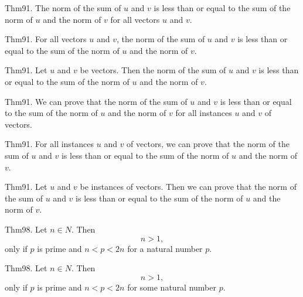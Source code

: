 \documentclass{article}
\begin{document}
Thm91. The norm of the sum of $u$ and $v$ is less than or equal to the sum of the norm of $u$ and the norm of $v$ for all vectors $u$ and $v$.

Thm91. For all vectors $u$ and $v$, the norm of the sum of $u$ and $v$ is less than or equal to the sum of the norm of $u$ and the norm of $v$.

Thm91. Let $u$ and $v$ be vectors. Then the norm of the sum of $u$ and $v$ is less than or equal to the sum of the norm of $u$ and the norm of $v$.

Thm91. We can prove that the norm of the sum of $u$ and $v$ is less than or equal to the sum of the norm of $u$ and the norm of $v$ for all instances $u$ and $v$ of vectors.

Thm91. For all instances $u$ and $v$ of vectors, we can prove that the norm of the sum of $u$ and $v$ is less than or equal to the sum of the norm of $u$ and the norm of $v$.

Thm91. Let $u$ and $v$ be instances of vectors. Then we can prove that the norm of the sum of $u$ and $v$ is less than or equal to the sum of the norm of $u$ and the norm of $v$.

Thm98. Let $n \in N$. Then $$n > 1,$$ only if $p$ is prime and $n < p < 2 n$ for a natural number $p$.

Thm98. Let $n \in N$. Then $$n > 1,$$ only if $p$ is prime and $n < p < 2 n$ for some natural number $p$.
\end{document}
